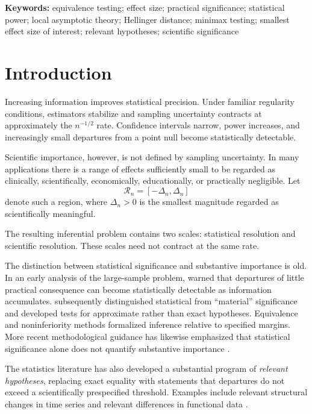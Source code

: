 \documentclass[11pt]{article}
\theoremstyle{remark}
\begin{document}
\noindent\textbf{Keywords:} equivalence testing; effect size; practical significance; statistical power; local asymptotic theory; Hellinger distance; minimax testing; smallest effect size of interest; relevant hypotheses; scientific significance

\clearpage
\section{Introduction}

Increasing information improves statistical precision. Under familiar regularity conditions, estimators stabilize and sampling uncertainty contracts at approximately the $n^{-1/2}$ rate. Confidence intervals narrow, power increases, and increasingly small departures from a point null become statistically detectable.

Scientific importance, however, is not defined by sampling uncertainty. In many applications there is a range of effects sufficiently small to be regarded as clinically, scientifically, economically, educationally, or practically negligible. Let
\[
\mathcal R_n=[-\Delta_n,\Delta_n]
\]
denote such a region, where $\Delta_n>0$ is the smallest magnitude regarded as scientifically meaningful.

The resulting inferential problem contains two scales: statistical resolution and scientific resolution. These scales need not contract at the same rate.

The distinction between statistical significance and substantive importance is old. In an early analysis of the large-sample problem, \citet{berkson1938} warned that departures of little practical consequence can become statistically detectable as information accumulates. \citet{hodges1954} subsequently distinguished statistical from ``material'' significance and developed tests for approximate rather than exact hypotheses. Equivalence and noninferiority methods formalized inference relative to specified margins. More recent methodological guidance has likewise emphasized that statistical significance alone does not quantify substantive importance \citep{wasserstein2016,wasserstein2019}.

The statistics literature has also developed a substantial program of \emph{relevant hypotheses}, replacing exact equality with statements that departures do not exceed a scientifically prespecified threshold. Examples include relevant structural changes in time series and relevant differences in functional data \citep{dette2016,dette2020}.
\end{document}
